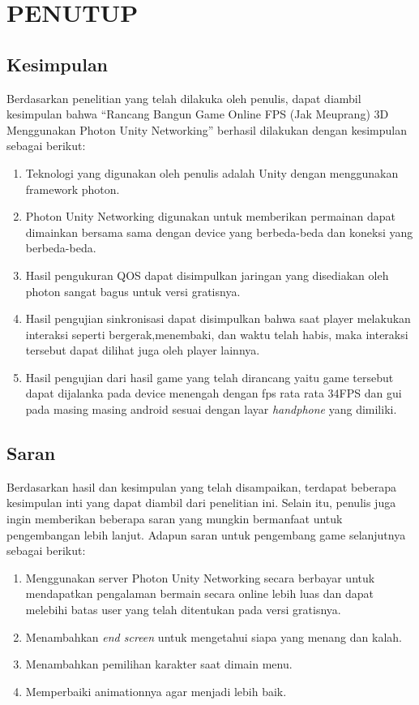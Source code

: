\chapter{PENUTUP}
\section{Kesimpulan}
\noindent

Berdasarkan penelitian yang telah dilakuka oleh penulis, dapat diambil kesimpulan bahwa “Rancang Bangun Game Online FPS (Jak Meuprang) 3D Menggunakan Photon Unity Networking” berhasil dilakukan dengan kesimpulan sebagai berikut:
\begin{enumerate}
    \item Teknologi yang digunakan oleh penulis adalah Unity dengan menggunakan framework photon.
    \item Photon Unity Networking digunakan untuk memberikan permainan dapat dimainkan bersama sama dengan device yang berbeda-beda dan koneksi yang berbeda-beda.
    \item Hasil pengukuran QOS dapat disimpulkan jaringan yang disediakan oleh photon sangat bagus untuk versi gratisnya.
    \item Hasil pengujian sinkronisasi dapat disimpulkan bahwa saat player melakukan interaksi seperti bergerak,menembaki, dan waktu telah habis, maka interaksi tersebut dapat dilihat juga oleh player lainnya.
    \item Hasil pengujian dari hasil game yang telah dirancang yaitu game tersebut dapat dijalanka pada device menengah dengan fps rata rata 34FPS dan gui pada masing masing android sesuai dengan layar \textit{handphone} yang dimiliki.
\end{enumerate}

\section{Saran}
\noindent

Berdasarkan hasil dan kesimpulan yang telah disampaikan, terdapat beberapa kesimpulan inti yang dapat diambil dari penelitian ini. Selain itu, penulis juga ingin memberikan beberapa saran yang mungkin bermanfaat untuk pengembangan lebih lanjut. Adapun saran untuk pengembang game selanjutnya sebagai berikut:
\begin{enumerate}
    \item Menggunakan server Photon Unity Networking secara berbayar untuk mendapatkan pengalaman bermain secara online lebih luas dan dapat melebihi batas user yang telah ditentukan pada versi gratisnya.
    \item Menambahkan \textit{end screen} untuk mengetahui siapa yang menang dan kalah.
    \item Menambahkan pemilihan karakter saat dimain menu.
    \item Memperbaiki animationnya agar menjadi lebih baik.
\end{enumerate}